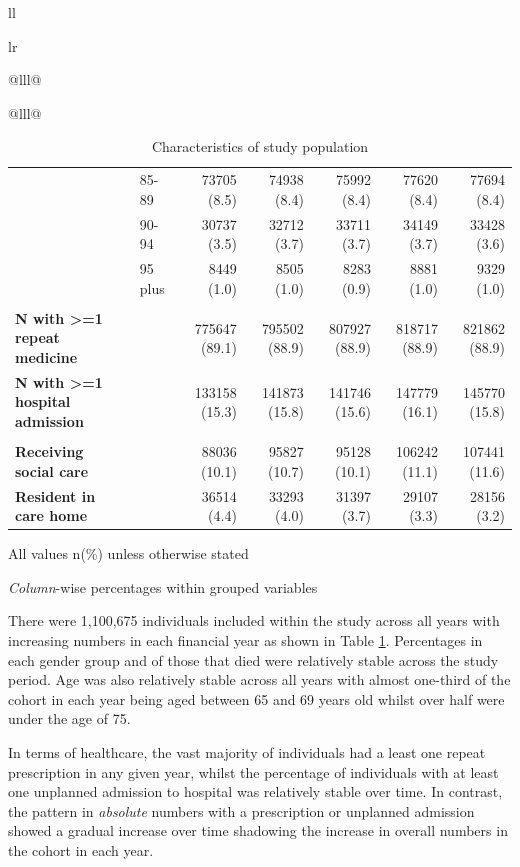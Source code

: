 \documentclass[12pt,a4paper,oneside,table]{report}
\begin{document}
\begin{tabular}[t]{ll}
\begin{tabular}{lr}
{\begin{tabular}{@{}lll@{}}
\begin{tabular}{@{}lll@{}}
\begin{table}[h]
{\begin{threeparttable}
\begin{tabular}{@{}llrrrrr@{}}
\textbf{} & 85-89 & 73705 (8.5) & 74938 (8.4) & 75992 (8.4) & 77620 (8.4) & 77694 (8.4) \\
\textbf{} & 90-94 & 30737 (3.5) & 32712 (3.7) & 33711 (3.7) & 34149 (3.7) & 33428 (3.6) \\
\textbf{} & 95 plus & 8449 (1.0) & 8505 (1.0) & 8283 (0.9) & 8881 (1.0) & 9329 (1.0) \\
{} & & & & & & \\
\textbf{N with  \textgreater{}=1 repeat medicine} &  & 775647 (89.1) & 795502 (88.9) & 807927 (88.9) & 818717 (88.9) & 821862 (88.9) \\
\textbf{N with \textgreater{}=1 hospital admission} &  & 133158 (15.3) & 141873 (15.8) & 141746 (15.6) & 147779 (16.1) & 145770 (15.8) \\
{} & & & & & & \\
\textbf{Receiving social care} &  & 88036 (10.1) & 95827 (10.7) & 95128 (10.1) & 106242 (11.1) & 107441 (11.6) \\
\textbf{Resident in care home} &  & 36514 (4.4) & 33293 (4.0) & 31397 (3.7) & 29107 (3.3) & 28156 (3.2) \\ \bottomrule
\end{tabular}%
\begin{tablenotes}
\item \footnotesize{All values n(\%) unless otherwise stated}
\item \footnotesize{\emph{Column}-wise percentages within grouped variables}
\end{tablenotes}
\end{threeparttable}%
}
\caption{Characteristics of study population}
\label{tab:results1-cohorttab}
\end{table}

There were 1,100,675 individuals included within the study across all
years with increasing numbers in each financial year as shown in Table
\ref{tab:results1-cohorttab}. Percentages in each gender group and of
those that died were relatively stable across the study period. Age was
also relatively stable across all years with almost one-third of the
cohort in each year being aged between 65 and 69 years old whilst over
half were under the age of 75.

In terms of healthcare, the vast majority of individuals had a least one
repeat prescription in any given year, whilst the percentage of
individuals with at least one unplanned admission to hospital was
relatively stable over time. In contrast, the pattern in \emph{absolute}
numbers with a prescription or unplanned admission showed a gradual
increase over time shadowing the increase in overall numbers in the
cohort in each year.


\end{tabular}
\end{tabular}}
\end{tabular}
\end{tabular}
\end{document}
